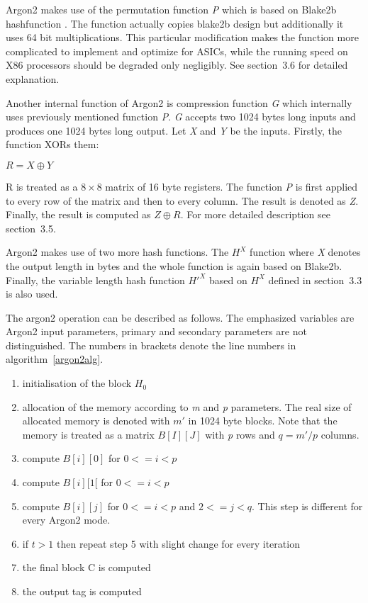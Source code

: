 \documentclass[nolof]{fithesis3}
\begin{document}
Argon2 makes use of the permutation function \emph{P} which is based on Blake2b hashfunction \parencite{blake2}. The function actually copies blake2b design but additionally it uses 64 bit multiplications. This particular modification makes the function more complicated to implement and optimize for ASICs, while the running speed on X86 processors should be degraded only negligibly. See \parencite{argon2draft}{section~3.6} for detailed explanation.

Another internal function of Argon2 is compression function \emph{G} which internally uses previously mentioned function \emph{P}. \emph{G} accepts two 1024 bytes long inputs and produces one 1024 bytes long output. Let \emph{X} and \emph{Y} be the inputs. Firstly, the function XORs them:

\(R = X \oplus Y \)

R is treated as a \(8 \times 8 \) matrix of 16 byte registers. The function \emph{P} is first applied to every row of the matrix and then to every column. The result is denoted as \emph{Z}. Finally, the result is computed as \(Z \oplus R\). For more detailed description see \parencite{argon2draft}{section~3.5}.

Argon2 makes use of two more hash functions. The \emph{\(H^X\)} function where \emph{X} denotes the output length in bytes and the whole function is again based on Blake2b. Finally, the variable length hash function \emph{\(H'^X\)} based on \emph{\(H^X\)} defined in \parencite{argon2draft}{section~3.3} is also used.

The argon2 operation can be described as follows. The emphasized variables are Argon2 input parameters, primary and secondary parameters are not distinguished. The numbers in brackets denote the line numbers in algorithm~\ref{argon2alg}.

\begin{enumerate}
\item initialisation of the block \(H_0\)

\item allocation of the memory according to \emph{m} and \emph{p} parameters. The real size of allocated memory is denoted with \(m'\) in 1024 byte blocks. Note that the memory is treated as a matrix \(B[I][J]\) with \emph{p} rows and \(q = m' / p\) columns.

\item compute \(B[i][0]\) for \(0 <= i < p\)

\item compute \(B[i][1[\) for \(0 <= i < p\)

\item compute \(B[i][j]\) for \(0 <= i < p\) and \(2 <= j < q\). This step is different for every Argon2 mode.

\item if \emph{\(t\)}\(> 1\) then repeat step 5 with slight change for every iteration

\item the final block C is computed

\item the output tag is computed
\end{enumerate}
\end{document}
